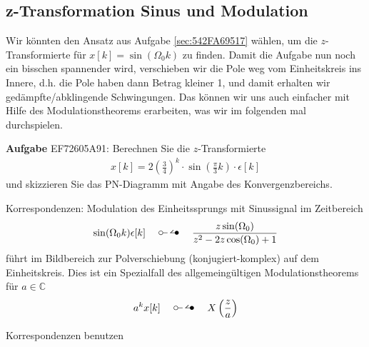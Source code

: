 \newpage
\subsection{z-Transformation Sinus und Modulation}
\label{sec:EF72605A91}
\begin{Ziel}
Wir könnten den Ansatz aus Aufgabe \ref{sec:542FA69517} wählen, um die
$z$-Transformierte für $x[k]=\sin(\Omega_0 k)$ zu finden.
Damit die Aufgabe nun noch ein bisschen spannender wird, verschieben wir die Pole
weg vom Einheitskreis ins Innere, d.h. die Pole haben dann Betrag kleiner 1,
und damit erhalten wir gedämpfte/abklingende Schwingungen.
Das können wir uns auch einfacher mit Hilfe des Modulationstheorems erarbeiten,
was wir im folgenden mal durchspielen.
\end{Ziel}
\textbf{Aufgabe} {\tiny EF72605A91}: Berechnen Sie die $z$-Transformierte
\begin{align}
x[k] = 2 \left(\frac{3}{4}\right)^k \cdot \sin(\frac{\pi}{3} k) \cdot \epsilon[k]
\end{align}
und skizzieren Sie das PN-Diagramm mit Angabe des Konvergenzbereichs.
\begin{Werkzeug}
Korrespondenzen:
%
Modulation des Einheitssprungs mit Sinussignal im Zeitbereich
\begin{align}
\sin(\Omega_0 k)\epsilon[k]\quad\ztransf\quad\frac{z\sin(\Omega_0)}{z^2 -2 z \cos(\Omega_0)+1}
\end{align}
führt im Bildbereich zur Polverschiebung (konjugiert-komplex) auf dem Einheitskreis.
%
Dies ist ein Spezialfall des allgemeingültigen Modulationstheorems für
$a\in\mathbb{C}$
\begin{align}
a^k x[k] \quad\ztransf\quad X\left(\frac{z}{a} \right)
\end{align}
\end{Werkzeug}
\begin{Ansatz}
Korrespondenzen benutzen
\end{Ansatz}

